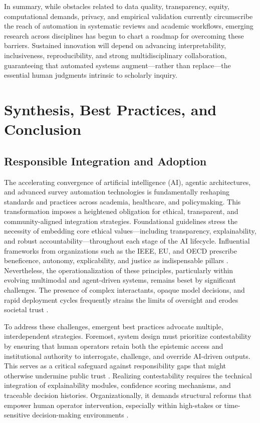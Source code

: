 In summary, while obstacles related to data quality, transparency, equity, computational demands, privacy, and empirical validation currently circumscribe the reach of automation in systematic reviews and academic workflows, emerging research across disciplines has begun to chart a roadmap for overcoming these barriers. Sustained innovation will depend on advancing interpretability, inclusiveness, reproducibility, and strong multidisciplinary collaboration, guaranteeing that automated systems augment—rather than replace—the essential human judgments intrinsic to scholarly inquiry.

\section{Synthesis, Best Practices, and Conclusion}

\subsection{Responsible Integration and Adoption}

The accelerating convergence of artificial intelligence (AI), agentic architectures, and advanced survey automation technologies is fundamentally reshaping standards and practices across academia, healthcare, and policymaking. This transformation imposes a heightened obligation for ethical, transparent, and community-aligned integration strategies. Foundational guidelines stress the necessity of embedding core ethical values—including transparency, explainability, and robust accountability—throughout each stage of the AI lifecycle. Influential frameworks from organizations such as the IEEE, EU, and OECD prescribe beneficence, autonomy, explicability, and justice as indispensable pillars \cite{ref95,ref96,ref100,ref106,ref109,ref110}. Nevertheless, the operationalization of these principles, particularly within evolving multimodal and agent-driven systems, remains beset by significant challenges. The presence of complex interactants, opaque model decisions, and rapid deployment cycles frequently strains the limits of oversight and erodes societal trust \cite{ref98,ref100,ref106}.

To address these challenges, emergent best practices advocate multiple, interdependent strategies. Foremost, system design must prioritize contestability by ensuring that human operators retain both the epistemic access and institutional authority to interrogate, challenge, and override AI-driven outputs. This serves as a critical safeguard against responsibility gaps that might otherwise undermine public trust \cite{ref97,ref98,ref100}. Realizing contestability requires the technical integration of explainability modules, confidence scoring mechanisms, and traceable decision histories. Organizationally, it demands structural reforms that empower human operator intervention, especially within high-stakes or time-sensitive decision-making environments \cite{ref96,ref97,ref100,ref106}.

